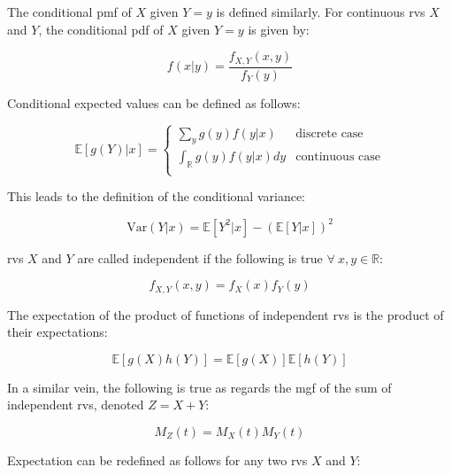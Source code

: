 \documentclass{report}
\begin{document}
The conditional \gls{pmf} of $X$ given $Y = y$ is defined similarly. For continuous \glspl{rv} $X$ and $Y$, the conditional \gls{pdf} of $X$ given $Y = y$ is given by:

\begin{equation}\label{eq:conditional-pdf}
    f(x|y) = \frac{f_{X, Y}(x,y)}{f_Y(y)}
\end{equation}

Conditional expected values can be defined as follows:

\begin{equation}\label{eq:conditional-ev}
    \mathbb{E}[g(Y) | x] = \begin{cases}
        \sum_y g(y)f(y|x) & \text{discrete case} \\
        \int_{\mathbb{R}} g(y) f(y|x) dy & \text{continuous case} \\
    \end{cases}
\end{equation}

This leads to the definition of the conditional variance:

\begin{equation}\label{eq:conditional-variance-1}
    \text{Var}(Y|x) = \mathbb{E}\left[Y^2|x\right] - \left(\mathbb{E}[Y|x]\right)^2
\end{equation}

\glspl{rv} $X$ and $Y$ are called independent if the following is true $\forall \: x, y \in \mathbb{R}$:

\begin{equation}\label{eq:independent-distributions}
    f_{X, Y}(x,y) = f_X(x)f_Y(y)
\end{equation}

The expectation of the product of functions of independent \glspl{rv} is the product of their expectations:

\begin{equation}\label{eq:independent-expectation}
    \mathbb{E}[g(X)h(Y)] = \mathbb{E}[g(X)]\mathbb{E}[h(Y)]
\end{equation}

In a similar vein, the following is true as regards the \gls{mgf} of the sum of independent \glspl{rv}, denoted $Z = X + Y$:

\begin{equation}\label{eq:mgf-of-sum-of-independent-rvs}
    M_Z(t) = M_X(t)M_Y(t)
\end{equation}

Expectation can be redefined as follows for any two \glspl{rv} $X$ and $Y$:
\end{document}
